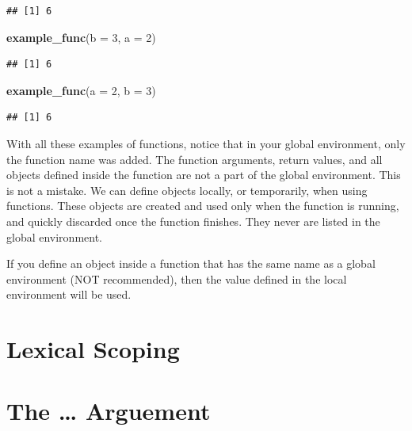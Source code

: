 \documentclass[
]{book}
\newenvironment{Shaded}{\begin{snugshade}}{\end{snugshade}}
\newcommand{\DataTypeTok}[1]{\textcolor[rgb]{0.13,0.29,0.53}{#1}}
\newcommand{\DecValTok}[1]{\textcolor[rgb]{0.00,0.00,0.81}{#1}}
\newcommand{\KeywordTok}[1]{\textcolor[rgb]{0.13,0.29,0.53}{\textbf{#1}}}
\newcommand{\NormalTok}[1]{#1}
\begin{document}
\begin{verbatim}
## [1] 6
\end{verbatim}

\begin{Shaded}
\begin{Highlighting}[]
\KeywordTok{example_func}\NormalTok{(}\DataTypeTok{b =} \DecValTok{3}\NormalTok{, }\DataTypeTok{a =} \DecValTok{2}\NormalTok{)}
\end{Highlighting}
\end{Shaded}

\begin{verbatim}
## [1] 6
\end{verbatim}

\begin{Shaded}
\begin{Highlighting}[]
\KeywordTok{example_func}\NormalTok{(}\DataTypeTok{a =} \DecValTok{2}\NormalTok{, }\DataTypeTok{b =} \DecValTok{3}\NormalTok{)}
\end{Highlighting}
\end{Shaded}

\begin{verbatim}
## [1] 6
\end{verbatim}

With all these examples of functions, notice that in your global environment, only the function name was added. The function arguments, return values, and all objects defined inside the function are not a part of the global environment. This is not a mistake. We can define objects locally, or temporarily, when using functions. These objects are created and used only when the function is running, and quickly discarded once the function finishes. They never are listed in the global environment.

If you define an object inside a function that has the same name as a global environment (NOT recommended), then the value defined in the local environment will be used.

\hypertarget{lexical-scoping}{%
\section{Lexical Scoping}\label{lexical-scoping}}

\hypertarget{the-arguement}{%
\section{The \ldots{} Arguement}\label{the-arguement}}
\end{document}

